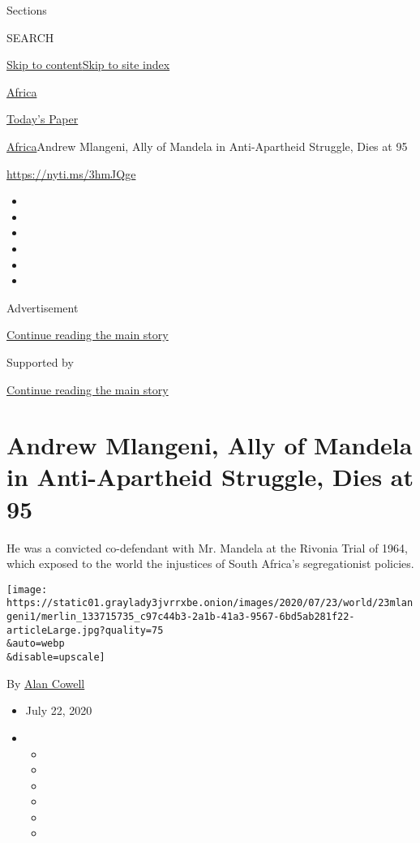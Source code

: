 Sections

SEARCH

\protect\hyperlink{site-content}{Skip to
content}\protect\hyperlink{site-index}{Skip to site index}

\href{https://www.nytimes3xbfgragh.onion/section/world/africa}{Africa}

\href{https://myaccount.nytimes3xbfgragh.onion/auth/login?response_type=cookie\&client_id=vi}{}

\href{https://www.nytimes3xbfgragh.onion/section/todayspaper}{Today's
Paper}

\href{/section/world/africa}{Africa}\textbar{}Andrew Mlangeni, Ally of
Mandela in Anti-Apartheid Struggle, Dies at 95

\url{https://nyti.ms/3hmJQge}

\begin{itemize}
\item
\item
\item
\item
\item
\item
\end{itemize}

Advertisement

\protect\hyperlink{after-top}{Continue reading the main story}

Supported by

\protect\hyperlink{after-sponsor}{Continue reading the main story}

\hypertarget{andrew-mlangeni-ally-of-mandela-in-anti-apartheid-struggle-dies-at-95}{%
\section{Andrew Mlangeni, Ally of Mandela in Anti-Apartheid Struggle,
Dies at
95}\label{andrew-mlangeni-ally-of-mandela-in-anti-apartheid-struggle-dies-at-95}}

He was a convicted co-defendant with Mr. Mandela at the Rivonia Trial of
1964, which exposed to the world the injustices of South Africa's
segregationist policies.

\texttt{[image: https://static01.graylady3jvrrxbe.onion/images/2020/07/23/world/23mlangeni1/merlin\_133715735\_c97c44b3-2a1b-41a3-9567-6bd5ab281f22-articleLarge.jpg?quality=75\\\&auto=webp\\\&disable=upscale]}

By \href{https://www.nytimes3xbfgragh.onion/by/alan-cowell}{Alan Cowell}

\begin{itemize}
\item
  July 22, 2020
\item
  \begin{itemize}
  \item
  \item
  \item
  \item
  \item
  \item
  \end{itemize}
\end{itemize}

